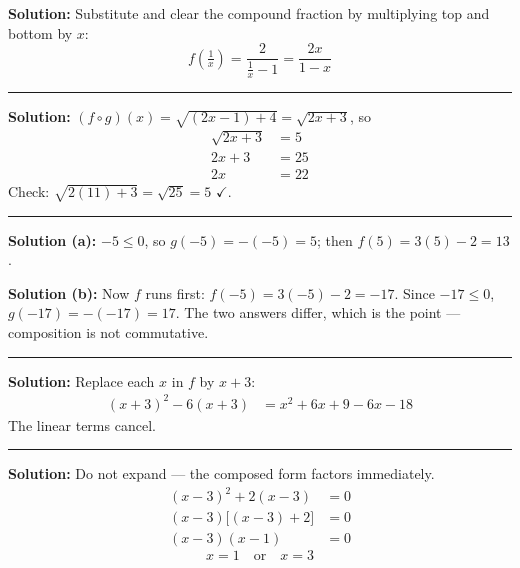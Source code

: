 \documentclass[12pt]{article}
\begin{document}
\textbf{Solution:} Substitute and clear the compound fraction by multiplying top and bottom by $x$:
\[ f\!\left(\tfrac{1}{x}\right) = \frac{2}{\tfrac{1}{x} - 1} = \frac{2x}{1 - x} \]

\vspace{0.1cm}\noindent\rule{\linewidth}{0.2pt}


\textbf{Solution:} $(f \circ g)(x) = \sqrt{(2x - 1) + 4} = \sqrt{2x + 3}$, so
\begin{align*}
  \sqrt{2x + 3} &= 5 \\
  2x + 3 &= 25 \\
  2x &= 22
\end{align*}
Check: $\sqrt{2(11) + 3} = \sqrt{25} = 5$ $\checkmark$. 

\vspace{0.1cm}\noindent\rule{\linewidth}{0.2pt}


\textbf{Solution (a):} $-5 \leq 0$, so $g(-5) = -(-5) = 5$; then $f(5) = 3(5) - 2 = 13$. 

\textbf{Solution (b):} Now $f$ runs first: $f(-5) = 3(-5) - 2 = -17$. Since $-17 \leq 0$, $g(-17) = -(-17) = 17$. The two answers differ, which is the point --- composition is not commutative. 

\vspace{0.1cm}\noindent\rule{\linewidth}{0.2pt}


\textbf{Solution:} Replace each $x$ in $f$ by $x + 3$:
\begin{align*}
  (x + 3)^{2} - 6(x + 3) &= x^{2} + 6x + 9 - 6x - 18
\end{align*}
The linear terms cancel. 

\vspace{0.1cm}\noindent\rule{\linewidth}{0.2pt}


\textbf{Solution:} Do not expand --- the composed form factors immediately.
\begin{align*}
  (x - 3)^{2} + 2(x - 3) &= 0 \\
  (x - 3)\bigl[(x - 3) + 2\bigr] &= 0 \\
  (x - 3)(x - 1) &= 0
\end{align*}
\[ \boxed{x = 1 \quad \text{or} \quad x = 3} \]
\end{document}
